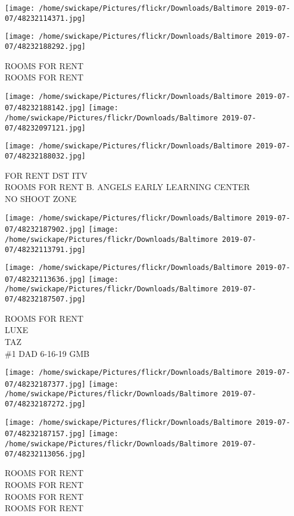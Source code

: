 \documentclass[10pt,letterpaper]{article}
\begin{document}
\texttt{[image: /home/swickape/Pictures/flickr/Downloads/Baltimore 2019-07-07/48232114371.jpg]}

\vspace{0.25in}
\texttt{[image: /home/swickape/Pictures/flickr/Downloads/Baltimore 2019-07-07/48232188292.jpg]}

ROOMS FOR RENT\\
ROOMS FOR RENT
\pagebreak

\texttt{[image: /home/swickape/Pictures/flickr/Downloads/Baltimore 2019-07-07/48232188142.jpg]}
\texttt{[image: /home/swickape/Pictures/flickr/Downloads/Baltimore 2019-07-07/48232097121.jpg]}

\vspace{0.25in}
\texttt{[image: /home/swickape/Pictures/flickr/Downloads/Baltimore 2019-07-07/48232188032.jpg]}

FOR RENT DST ITV\\
ROOMS FOR RENT B. ANGELS EARLY LEARNING CENTER\\
NO SHOOT ZONE
\pagebreak

\texttt{[image: /home/swickape/Pictures/flickr/Downloads/Baltimore 2019-07-07/48232187902.jpg]}
\texttt{[image: /home/swickape/Pictures/flickr/Downloads/Baltimore 2019-07-07/48232113791.jpg]}

\texttt{[image: /home/swickape/Pictures/flickr/Downloads/Baltimore 2019-07-07/48232113636.jpg]}
\texttt{[image: /home/swickape/Pictures/flickr/Downloads/Baltimore 2019-07-07/48232187507.jpg]}

ROOMS FOR RENT\\
LUXE\\
TAZ\\
\#1 DAD 6{-}16{-}19 GMB
\pagebreak

\texttt{[image: /home/swickape/Pictures/flickr/Downloads/Baltimore 2019-07-07/48232187377.jpg]}
\texttt{[image: /home/swickape/Pictures/flickr/Downloads/Baltimore 2019-07-07/48232187272.jpg]}

\texttt{[image: /home/swickape/Pictures/flickr/Downloads/Baltimore 2019-07-07/48232187157.jpg]}
\texttt{[image: /home/swickape/Pictures/flickr/Downloads/Baltimore 2019-07-07/48232113056.jpg]}

ROOMS FOR RENT\\
ROOMS FOR RENT\\
ROOMS FOR RENT\\
ROOMS FOR RENT
\pagebreak
\end{document}
